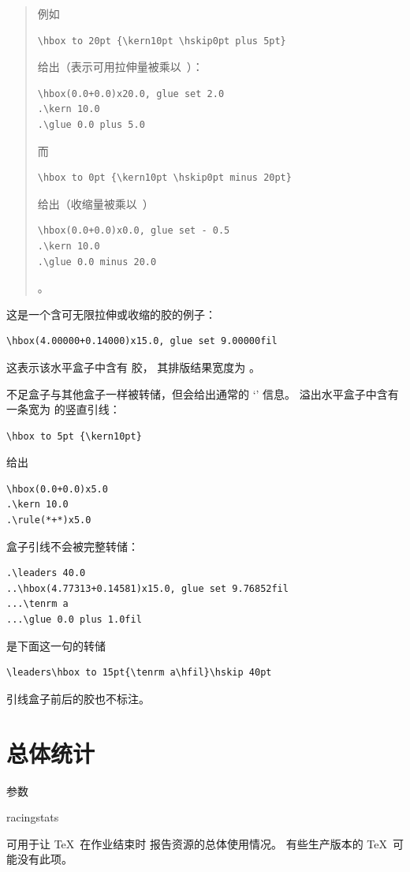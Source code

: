 \documentclass[a4paper]{rapport3}
\makeatletter
\newenvironment{example}{\begin{quotation}}{\end{quotation}}
\def\cstoidx#1\par{\index{#1@\cs{#1}}}
\def\csidx#1{\cstoidx #1\par\cs{#1}}
\makeatother
\begin{document}
\begin{example}例如
\begin{verbatim}
\hbox to 20pt {\kern10pt \hskip0pt plus 5pt}
\end{verbatim}
给出（表示可用拉伸量被乘以~）：
\begin{verbatim}
\hbox(0.0+0.0)x20.0, glue set 2.0
.\kern 10.0
.\glue 0.0 plus 5.0
\end{verbatim}
而
\begin{verbatim}
\hbox to 0pt {\kern10pt \hskip0pt minus 20pt}
\end{verbatim}
给出（收缩量被乘以~）
\begin{verbatim}
\hbox(0.0+0.0)x0.0, glue set - 0.5
.\kern 10.0
.\glue 0.0 minus 20.0
\end{verbatim}
。
\end{example}

这是一个含可无限拉伸或收缩的胶的例子：
\begin{verbatim}
\hbox(4.00000+0.14000)x15.0, glue set 9.00000fil
\end{verbatim}
这表示该水平盒子中含有  胶，
其排版结果宽度为 \n{9pt}。

不足盒子与其他盒子一样被转储，但会给出通常的
`' 信息。
溢出水平盒子中含有一条宽为  的竖直引线：
\begin{verbatim}
\hbox to 5pt {\kern10pt}
\end{verbatim}
给出
\begin{verbatim}
\hbox(0.0+0.0)x5.0
.\kern 10.0
.\rule(*+*)x5.0
\end{verbatim}


盒子引线不会被完整转储：
\begin{verbatim}
.\leaders 40.0
..\hbox(4.77313+0.14581)x15.0, glue set 9.76852fil
...\tenrm a
...\glue 0.0 plus 1.0fil
\end{verbatim}
是下面这一句的转储
\begin{verbatim}
\leaders\hbox to 15pt{\tenrm a\hfil}\hskip 40pt
\end{verbatim}
引线盒子前后的胶也不标注。

\section{总体统计}

参数 \csidx{tracingstats} 可用于让 \TeX\ 在作业结束时
报告资源的总体使用情况。
有些生产版本的 \TeX\ 可能没有此项。
\end{document}
